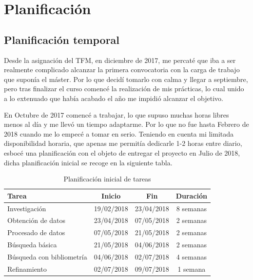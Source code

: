 \chapter{Planificación}

\section{Planificación temporal}

Desde la asignación del \acrshort{TFM}, en diciembre de 2017, me percaté que iba a ser realmente complicado alcanzar la primera convocatoria con la carga de trabajo que suponía el máster. Por lo que decidí tomarlo con calma y llegar a septiembre, pero tras finalizar el curso comencé la realización de mis prácticas, lo cual unido a lo extenuado que había acabado el año me impidió alcanzar el objetivo. 

En Octubre de 2017 comencé a trabajar, lo que supuso muchas horas libres menos al día y me llevó un tiempo adaptarme. Por lo que no fue hasta Febrero de 2018 cuando me lo empecé a tomar en serio. Teniendo en cuenta mi limitada disponibilidad horaria, que apenas me permitía dedicarle 1-2 horas entre diario, esbocé una planificación con el objeto de entregar el proyecto en Julio de 2018, dicha planificación inicial se recoge en la siguiente tabla.

\begin{table} [h!]
	\centering
	\begin{tabular}{l c c c}
		\hline
		\textbf{Tarea}            & \textbf{Inicio} & \textbf{Fin} & \textbf{Duración} \\ \hline\hline
		Investigación             & 19/02/2018      & 23/04/2018   & 8 semanas         \\ \hline
		Obtención de datos        & 23/04/2018      & 07/05/2018   & 2 semanas         \\ \hline
		Procesado de datos        & 07/05/2018      & 21/05/2018   & 2 semanas         \\ \hline
		Búsqueda básica           & 21/05/2018      & 04/06/2018   & 2 semanas         \\ \hline
		Búsqueda con bibliometría & 04/06/2018      & 02/07/2018   & 4 semanas         \\ \hline
		Refinamiento              & 02/07/2018      & 09/07/2018   & 1 semana          \\ \hline
	\end{tabular}
	\caption{Planificación inicial de tareas}
\end{table}

